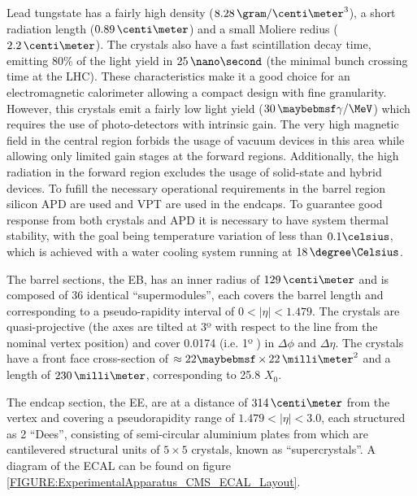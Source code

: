 Lead tungstate has a fairly high density ($8.28\,\gram/\centi\meter^3$), a short radiation length ($0.89\,\centi\meter$) and a small Moliere redius ($2.2\,\centi\meter$). The crystals also have a fast scintillation decay time, emitting 80\% of the light yield in $25\,\nano\second$ (the minimal bunch crossing time at the \gls{LHC}). These characteristics make it a good choice for an electromagnetic calorimeter allowing a compact design with fine granularity. However, this crystals emit a fairly low light yield ($30\,\gamma/\MeV$) which requires the use of photo-detectors with intrinsic gain. The very high magnetic field in the central region forbids the usage of vacuum devices in this area while allowing only limited gain stages at the forward regions. Additionally, the high radiation in the forward region excludes the usage of solid-state and hybrid devices. To fufill the necessary operational requirements in the barrel region silicon \gls{APD} are used and \gls{VPT} are used in the endcaps. To guarantee good response from both crystals and \gls{APD} it is necessary to have system thermal stability, with the goal being temperature variation of less than $0.1 \celsius$, which is achieved with a water cooling system running at $18\,\degree\Celsius$.

The barrel sections, the \gls{EB}, has an inner radius of $129\,\centi\meter$ and is composed of 36 identical ``supermodules'', each covers the barrel length and corresponding to a pseudo-rapidity interval of $0<|\eta|<1.479$. The crystals are quasi-projective (the axes are tilted at 3º with respect to the line from the nominal vertex position) and cover 0.0174 (i.e. 1º ) in $\Delta\phi$ and $\Delta\eta$. The crystals have a front face cross-section of $\approx 22 \times 22\,\milli\meter^2$ and a length of $230\,\milli\meter$, corresponding to 25.8 $X_0$.

The endcap section, the \gls{EE}, are at a distance of $314\,\centi\meter$ from the vertex and covering a pseudorapidity range of $1.479<|\eta|<3.0$, each structured as 2 ``Dees'', consisting of semi-circular aluminium plates from which are cantilevered structural units of $5\times 5$ crystals, known as ``supercrystals''. A diagram of the \gls{ECAL} can be found on figure \ref{FIGURE:ExperimentalApparatus_CMS_ECAL_Layout}.

